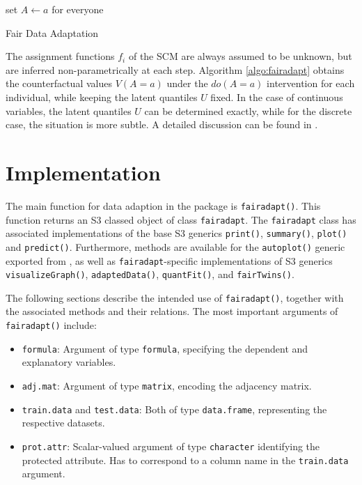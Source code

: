 \documentclass[
  nojss]{jss}
\providecommand{\tightlist}{%
  \setlength{\itemsep}{0pt}\setlength{\parskip}{0pt}}
\begin{document}
\begin{algorithm}
    \DontPrintSemicolon
    set $A \gets a$ for everyone\\
    \caption{Fair Data Adaptation}
    \label{algo:fairadapt}
\end{algorithm}

The assignment functions \(f_i\) of the SCM are always assumed to be
unknown, but are inferred non-parametrically at each step. Algorithm
\ref{algo:fairadapt} obtains the counterfactual values \(V(A = a)\)
under the \(do(A = a)\) intervention for each individual, while keeping
the latent quantiles \(U\) fixed. In the case of continuous variables,
the latent quantiles \(U\) can be determined exactly, while for the
discrete case, the situation is more subtle. A detailed discussion can
be found in \citet[Section~5]{plecko2020fair}.

\hypertarget{implementation}{%
\section{Implementation}\label{implementation}}

The main function for data adaption in the  package is
\texttt{fairadapt()}. This function returns an S3 classed object of
class \texttt{fairadapt}. The \texttt{fairadapt} class has associated
implementations of the base  S3 generics \texttt{print()},
\texttt{summary()}, \texttt{plot()} and \texttt{predict()}. Furthermore,
methods are available for the \texttt{autoplot()} generic exported from
 \citep{wickham2016ggplot2}, as well as
\texttt{fairadapt}-specific implementations of S3 generics
\texttt{visualizeGraph()}, \texttt{adaptedData()}, \texttt{quantFit()},
and \texttt{fairTwins()}.

The following sections describe the intended use of
\texttt{fairadapt()}, together with the associated methods and their
relations. The most important arguments of \texttt{fairadapt()} include:

\begin{itemize}
\tightlist
\item
  \texttt{formula}: Argument of type \texttt{formula}, specifying the
  dependent and explanatory variables.
\item
  \texttt{adj.mat}: Argument of type \texttt{matrix}, encoding the
  adjacency matrix.
\item
  \texttt{train.data} and \texttt{test.data}: Both of type
  \texttt{data.frame}, representing the respective datasets.
\item
  \texttt{prot.attr}: Scalar-valued argument of type \texttt{character}
  identifying the protected attribute. Has to correspond to a column
  name in the \texttt{train.data} argument.
\end{itemize}
\end{document}
